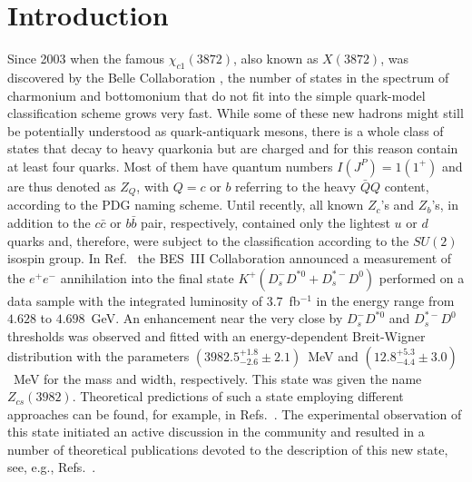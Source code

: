 \documentclass[preprint,12pt,3p]{elsarticle}
\begin{document}

\section{Introduction}
\label{Sec:intro}

Since 2003 when the famous $\chi_{c1}(3872)$, also known as $X(3872)$,
was discovered by the Belle Collaboration \cite{Belle:2003nnu}, the
number of states in the spectrum of charmonium and bottomonium that do
not fit into the simple quark-model classification scheme grows very
fast. While some of these new hadrons might still be potentially
understood as quark-antiquark mesons, there is a whole class of states
that decay to heavy quarkonia but are charged and for this reason contain at least four quarks. 
Most of them have quantum numbers $I(J^P)=1(1^+)$ and are thus denoted as $Z_Q$, with $Q=c$ or $b$ referring to the heavy $\bar QQ$
content, according to the PDG naming scheme.
Until recently, all known $Z_c$'s and $Z_b$'s, in addition to the $c\bar{c}$ or $b\bar{b}$ pair, respectively, contained only the lightest $u$ or $d$ quarks and, therefore, were subject to the classification according to the $SU(2)$ isospin group. 
In Ref.~\cite{BESIII:2020qkh} the BES~III Collaboration announced a
measurement of the $e^+e^-$ annihilation into the final state
$K^+(D_s^-D^{*0}+D_s^{*-}D^0)$ performed on a data sample with the
integrated luminosity of $3.7$~fb$^{-1}$ in the energy range from
$4.628$ to $4.698$~GeV. An enhancement near the very close by
$D_s^-D^{*0}$ and $D_s^{*-}D^0$ thresholds was observed and fitted with an energy-dependent Breit-Wigner distribution with the parameters $(3982.5^{+1.8}_{-2.6}\pm 2.1)$~MeV and $(12.8_{-4.4}^{+5.3}\pm 3.0)$~MeV for the mass and width, respectively. This state was given the name $Z_{cs}(3982)$. Theoretical predictions of such a state employing different approaches can be found, for example, in Refs.~\cite{Lee:2008uy,Chen:2013wca,Voloshin:2019ilw,Ferretti:2020ewe}.
The experimental observation of this state initiated an active discussion in the community and resulted in a number of theoretical publications devoted to the description of this new state, see, e.g.,
Refs.~\cite{Meng:2020ihj,Wan:2020oxt,Wang:2020kej,Yang:2020nrt,Chen:2020yvq,Cao:2020cfx,Wang:2020htx,Wang:2020iqt,Azizi:2020zyq,Simonov:2020ozp,Ikeno:2020mra,Wang:2020dgr,Guo:2020vmu,Albuquerque:2021tqd,Zhu:2021vtd,Ozdem:2021yvo,Faustov:2021hjs,Chen:2021uou,Ortega:2021enc,Shi:2021jyr,Giron:2021sla,Ding:2021igr,Karliner:2021qok,Wu:2021ezz}. 
\end{document}
